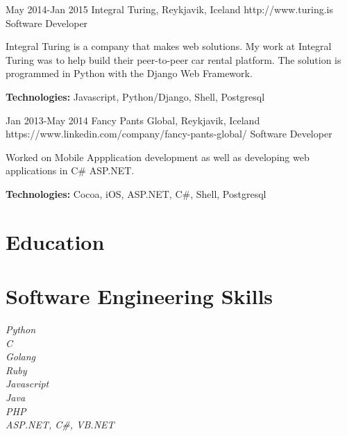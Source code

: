 \documentclass[10pt]{article} %
\begin{document}

\job
{May 2014-}{Jan 2015}
{Integral Turing, Reykjavik, Iceland}
{http://www.turing.is}
{Software Developer}
{Integral Turing is a company that makes web solutions. My work at Integral Turing was to help build their peer-to-peer car rental platform.
The solution is programmed in Python with the Django Web Framework.\\
\rule{0mm}{5mm}\textbf{Technologies:} Javascript, Python/Django, Shell, Postgresql}


\job
{Jan 2013-}{May 2014}
{Fancy Pants Global, Reykjavik, Iceland}
{https://www.linkedin.com/company/fancy-pants-global/}
{Software Developer}
{Worked on Mobile Appplication development as well as developing web applications in C\# ASP.NET. \\
\rule{0mm}{5mm}\textbf{Technologies:} Cocoa, iOS, ASP.NET, C\#, Shell, Postgresql}


\section{Education}



\section{Software Engineering Skills}

{
\textit{Python}\\
\textit{C}\\
\textit{Golang}\\
\textit{Ruby}\\
\textit{Javascript}\\
\textit{Java}\\
\textit{PHP}\\
\textit{ASP.NET, C\#, VB.NET}
}
\end{document}
